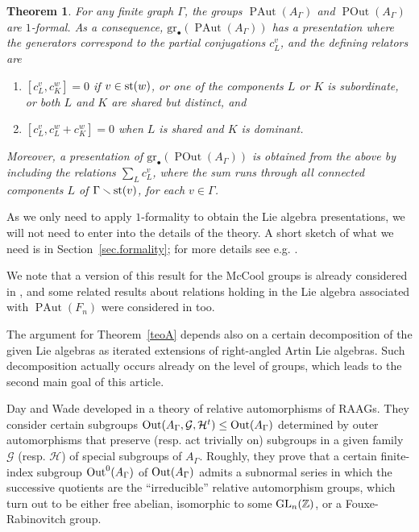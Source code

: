 \documentclass[10pt]{amsart}
\newtheorem{teo}{Theorem}
\theoremstyle{definition}
\newcommand{\Out}{{\rm Out}}
\newcommand{\GL}{{\rm GL}}
\newcommand{\st}{{\rm st}}
\newcommand{\Z}{\mathbb Z}
\newcommand{\PAut}{\operatorname{PAut}}
\newcommand{\POut}{\operatorname {POut}}
\newcommand{\gr}{\mathrm{gr}_\bullet}
\theoremstyle{definition}
\numberwithin{equation}{section}
\begin{document}
\begin{teo} \label{teoB}
For any finite graph $\Gamma$, the groups $\PAut(A_{\Gamma})$ and $\POut(A_{\Gamma})$ are $1$-formal. As a consequence, $\gr(\PAut(A_{\Gamma}))$ has a presentation where the generators correspond to the partial conjugations $c_L^v$, and the defining relators are
\begin{enumerate}
 \item $[c_L^v, c_K^w]=0$ if $v \in \st(w)$, or one of the components $L$ or $K$ is subordinate, or both $L$ and $K$ are shared but distinct, and
 \item $[c_L^v, c_L^w + c_K^w]=0$ when $L$ is shared and $K$ is dominant.
\end{enumerate}
Moreover, a presentation of $\gr(\POut(A_{\Gamma}))$ is obtained from the above by including the relations $\sum_L c_L^v$, where the sum runs through all connected components $L$ of $\Gamma \smallsetminus \st(v)$, for each $v \in \Gamma$.
\end{teo}

As we only need to apply $1$-formality to obtain the Lie algebra presentations, we will not need to enter into the details of the theory. A short sketch of what we need is in Section~\ref{sec.formality}; for more details see e.g. \cite{SuciuWang2}.

We note that a version of this result for the McCool groups is already considered in \cite{BerceanuPapadima}, and some related results about relations holding in the Lie algebra associated with $\PAut(F_n)$ were considered in \cite{Cohen} too.

The argument for Theorem~\ref{teoA} depends also on a certain decomposition of the given Lie algebras as iterated extensions of right-angled Artin Lie algebras. Such decomposition actually occurs already on the level of groups, which leads to the second main goal of this article.

Day and Wade developed in \cite{DayWade} a theory of relative automorphisms of RAAGs. They consider certain subgroups $\Out(A_{\Gamma}, \mathcal{G}, \mathcal{H}^t) \leq \Out(A_\Gamma)$ determined by outer automorphisms that preserve (resp. act trivially on) subgroups in a given family $\mathcal{G}$ (resp. $\mathcal{H}$) of special subgroups of $A_{\Gamma}$. Roughly, they prove that a certain finite-index subgroup $\Out^0(A_\Gamma)$ of $\Out(A_\Gamma)$ admits a subnormal series in which the successive quotients are the ``irreducible'' relative automorphism groups, which turn out to be either free abelian, isomorphic to some $\GL_n(\Z)$, or a Fouxe-Rabinovitch group.
\end{document}
